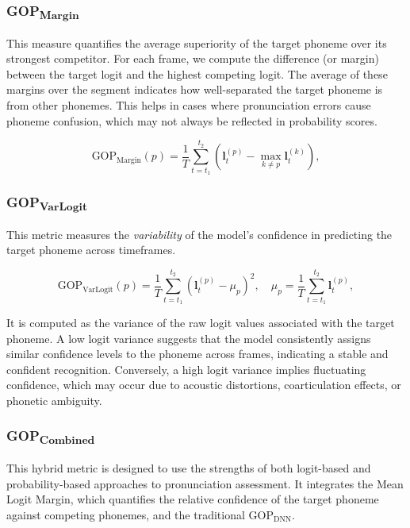 \documentclass{Interspeech}
\begin{document}
\subsubsection{GOP\textsubscript{Margin}}
This measure quantifies the average superiority of the target phoneme over its strongest competitor. For each frame, we compute the difference (or margin) between the target logit and the highest competing logit. The average of these margins over the segment indicates how well-separated the target phoneme is from other phonemes. This helps in cases where pronunciation errors cause phoneme confusion, which may not always be reflected in probability scores.

\begin{equation}
    \text{GOP}_{\text{Margin}}(p) = \frac{1}{T} \sum_{t=t_1}^{t_2} \left( \mathbf{l}_t^{(p)} - \max_{k \neq p} \mathbf{l}_t^{(k)} \right),
    \label{eq:gop_margin}
\end{equation}


\subsubsection{\texorpdfstring{GOP\textsubscript{VarLogit}}{GOP VarLogit}}

This metric measures the \textit{variability} of the model's confidence in predicting the target phoneme across timeframes. 

\vspace{-0.2cm}
\begin{equation}
    \text{GOP}_{\text{VarLogit}}(p) = \frac{1}{T} \sum_{t=t_1}^{t_2} \left( \mathbf{l}_t^{(p)} - \mu_p \right)^2, \quad \mu_p = \frac{1}{T} \sum_{t=t_1}^{t_2} \mathbf{l}_t^{(p)},
    \label{eq:gop_variance}
\end{equation}

It is computed as the variance of the raw logit values associated with the target phoneme. A low logit variance suggests that the model consistently assigns similar confidence levels to the phoneme across frames, indicating a stable and confident recognition. Conversely, a high logit variance implies fluctuating confidence, which may occur due to acoustic distortions, coarticulation effects, or phonetic ambiguity.

\subsubsection{\texorpdfstring{GOP\textsubscript{Combined}}{GOP Combined}} 
This hybrid metric is designed to use the strengths of both logit-based and probability-based approaches to pronunciation assessment. It integrates the Mean Logit Margin, which quantifies the relative confidence of the target phoneme against competing phonemes, and the traditional $\text{GOP}_{\text{DNN}}$.  
\end{document}
